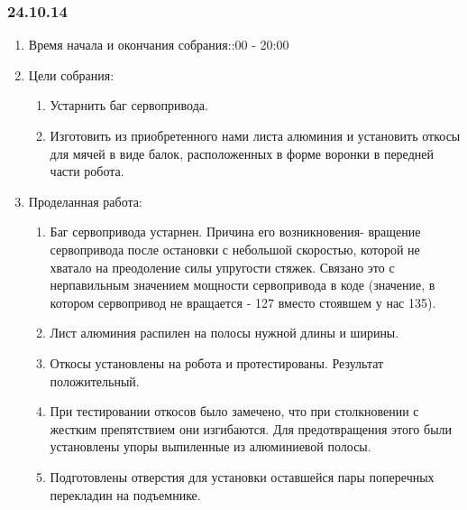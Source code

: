 
\subsubsection{24.10.14}

\begin{enumerate}
	\item Время начала и окончания собрания::00 - 20:00
	\item Цели собрания:\newline
	\begin{enumerate}
	  \item Устарнить баг сервопривода.\newline
	  
	  \item Изготовить из приобретенного нами листа алюминия и установить откосы для мячей в виде балок, расположенных в форме воронки в передней части робота.\newline
	  
    \end{enumerate}
    
	\item Проделанная работа:\newline
	\begin{enumerate}
	  \item Баг сервопривода устарнен. Причина его возникновения- вращение сервопривода после остановки с небольшой скоростью, которой не хватало на преодоление силы упругости стяжек. Связано это с нерпавильным значением мощности сервопривода в коде (значение, в котором сервопривод не вращается - 127 вместо стоявшем у нас 135).\newline
      
      \item Лист алюминия распилен на полосы нужной длины и ширины.\newline
      
      \item Откосы установлены на робота и протестированы. Результат положительный.\newline
      
      \item При тестировании откосов было замечено, что при столкновении с жестким препятствием они изгибаются. Для предотвращения этого были установлены упоры выпиленные из алюминиевой полосы.\newline
      
      \item Подготовлены отверстия для установки оставшейся пары поперечных перекладин на подъемнике.\newline
      

\end{enumerate}
\end{enumerate}
